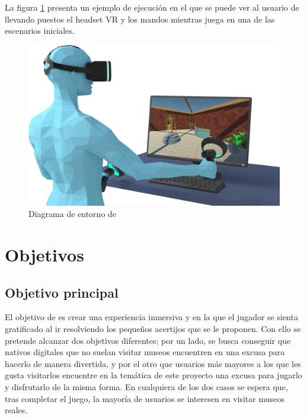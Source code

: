 La figura \ref{fig:entorno} presenta un ejemplo de ejecución en el que se puede ver al usuario de \MineRVa llevando puestos el headset \acs{VR} y los mandos mientras juega en una de las escenarios iniciales.

\vspace{0.4cm}

\begin{figure}[!h]
\begin{center}
\includegraphics[width=1\textwidth]{imagenes/1/entorno-diffuse-2.png}
\caption{Diagrama de entorno de \MineRVa}
\label{fig:entorno}
\end{center}
\end{figure}

\section{Objetivos}

\subsection{Objetivo principal}

El objetivo de \MineRVa es crear una experiencia inmersiva y en la que el jugador se sienta gratificado al ir resolviendo los pequeños acertijos que se le proponen. Con ello se pretende alcanzar dos objetivos diferentes; por un lado, se busca conseguir que nativos digitales que no suelan visitar museos encuentren en \MineRVa una excusa para hacerlo de manera divertida, y por el otro que usuarios más mayores a los que les gusta visitarlos encuentre en la temática de este proyecto una excusa para jugarlo y disfrutarlo de la misma forma. En cualquiera de los dos casos se espera que, tras completar el juego, la mayoría de usuarios se interesen en visitar museos reales.

